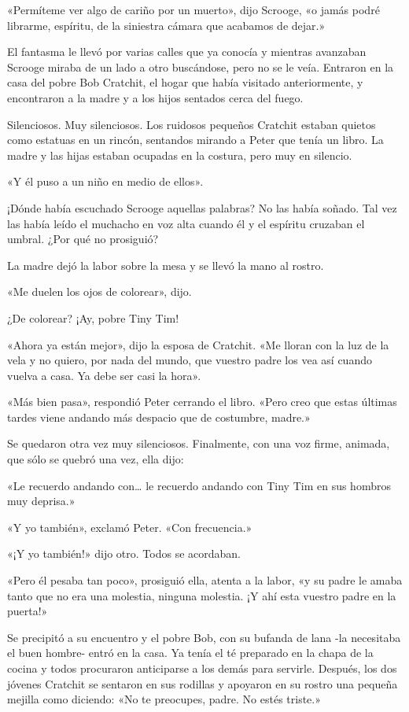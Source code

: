 \documentclass{novela}
\begin{document}
 «Permíteme ver algo de cariño por un muerto», dijo Scrooge, «o jamás podré librarme, espíritu, de la siniestra cámara que acabamos de dejar.»

 El fantasma le llevó por varias calles que ya conocía y mientras avanzaban Scrooge miraba de un lado a otro buscándose, pero no se le veía. Entraron en la casa del pobre Bob Cratchit, el hogar que había visitado anteriormente, y encontraron a la madre y a los hijos sentados cerca del fuego.

 Silenciosos. Muy silenciosos. Los ruidosos pequeños Cratchit estaban quietos como estatuas en un rincón, sentandos mirando a Peter que tenía un libro. La madre y las hijas estaban ocupadas en la costura, pero muy en silencio.

 «Y él puso a un niño en medio de ellos».

 ¡Dónde había escuchado Scrooge aquellas palabras? No las había soñado. Tal vez las había leído el muchacho en voz alta cuando él y el espíritu cruzaban el umbral. ¿Por qué no prosiguió?

 La madre dejó la labor sobre la mesa y se llevó la mano al rostro.

 «Me duelen los ojos de colorear», dijo.

 ¿De colorear? ¡Ay, pobre Tiny Tim!

 «Ahora ya están mejor», dijo la esposa de Cratchit. «Me lloran con la luz de la vela y no quiero, por nada del mundo, que vuestro padre los vea así cuando vuelva a casa. Ya debe ser casi la hora».

 «Más bien pasa», respondió Peter cerrando el libro. «Pero creo que estas últimas tardes viene andando más despacio que de costumbre, madre.»

 Se quedaron otra vez muy silenciosos. Finalmente, con una voz firme, animada, que sólo se quebró una vez, ella dijo:

 «Le recuerdo andando con{\ldots} le recuerdo andando con Tiny Tim en sus hombros muy deprisa.»

 «Y yo también», exclamó Peter. «Con frecuencia.»

 «¡Y yo también!» dijo otro. Todos se acordaban.

 «Pero él pesaba tan poco», prosiguió ella, atenta a la labor, «y su padre le amaba tanto que no era una molestia, ninguna molestia. ¡Y ahí esta vuestro padre en la puerta!»

 Se precipitó a su encuentro y el pobre Bob, con su bufanda de lana -la necesitaba el buen hombre- entró en la casa. Ya tenía el té preparado en la chapa de la cocina y todos procuraron anticiparse a los demás para servirle. Después, los dos jóvenes Cratchit se sentaron en sus rodillas y apoyaron en su rostro una pequeña mejilla como diciendo: «No te preocupes, padre. No estés triste.»
\end{document}
